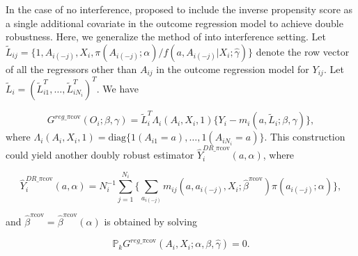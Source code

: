 \documentclass[oupdraft]{biostatistics}
\begin{document}
In the case of no interference, \citet{scharfstein1999adjusting} proposed to include the inverse propensity score as a single additional covariate in the outcome regression model to achieve double robustness. Here, we generalize the method of \citet{scharfstein1999adjusting} into interference setting. Let $\tilde L_{ij}=\{1,A_{i(-j)},X_i,\pi(A_{i(-j)};\alpha)/f(a, A_{i(-j)}|X_i;\hat\gamma)\}$ denote the row vector of all the regressors other than $A_{ij}$ in the outcome regression model for $Y_{ij}$. Let $\tilde L_i=(\tilde L_{i1}^T,\ldots,\tilde L_{iN_i}^T)^T$. We have

$$G^{reg\_\pi\text{cov}}(O_i;\beta,\gamma)=\tilde L_i^T\Lambda_i(A_i,X_i,1)\{Y_i- m_i(a,\tilde L_i;\beta,\gamma)\},$$ 
where  $\Lambda_i(A_i,X_i,1)=\text{diag}\biggl\{1(A_{i1}=a),\ldots,1(A_{iN_i}=a)\biggr\}$. This construction could yield another doubly robust estimator $\widehat{Y}_i^{DR\_\pi\text{cov}}(a,\alpha)$, where

\vspace{-0.8cm}
\begin{equation*}\label{eq: DR_picov_estimator}
  \widehat{Y}_i^{DR\_\pi\text{cov}}(a,\alpha)=N_i^{-1}\sum_{j=1}^{N_i}\Biggl\{\sum_{a_{i(-j)}}m_{ij}(a,a_{i(-j)},X_i;\hat\beta^{\pi\text{cov}})\pi(a_{i(-j)};\alpha)
 \Biggr\},
 \end{equation*}

\noindent and $\hat\beta^{\pi\text{cov}}=\hat\beta^{\pi\text{cov}}(\alpha)$ is obtained by solving 

\begin{equation}\label{eq: ee_DR_picov}
\mathds{P}_kG^{reg\_\pi\text{cov}}(A_i,X_i;\alpha,\beta,\hat\gamma)=0.
\end{equation}
\end{document}
